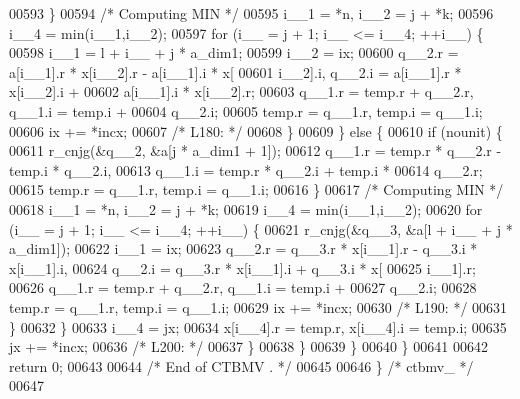 \begin{DoxyCode}
00593             \}
00594 \textcolor{comment}{/* Computing MIN */}
00595             i\_\_1 = *n, i\_\_2 = j + *k;
00596             i\_\_4 = min(i\_\_1,i\_\_2);
00597             \textcolor{keywordflow}{for} (i\_\_ = j + 1; i\_\_ <= i\_\_4; ++i\_\_) \{
00598                 i\_\_1 = l + i\_\_ + j * a\_dim1;
00599                 i\_\_2 = ix;
00600                 q\_\_2.r = a[i\_\_1].r * x[i\_\_2].r - a[i\_\_1].i * x[
00601                     i\_\_2].i, q\_\_2.i = a[i\_\_1].r * x[i\_\_2].i + 
00602                     a[i\_\_1].i * x[i\_\_2].r;
00603                 q\_\_1.r = temp.r + q\_\_2.r, q\_\_1.i = temp.i + 
00604                     q\_\_2.i;
00605                 temp.r = q\_\_1.r, temp.i = q\_\_1.i;
00606                 ix += *incx;
00607 \textcolor{comment}{/* L180: */}
00608             \}
00609             \} \textcolor{keywordflow}{else} \{
00610             \textcolor{keywordflow}{if} (nounit) \{
00611                 r\_cnjg(&q\_\_2, &a[j * a\_dim1 + 1]);
00612                 q\_\_1.r = temp.r * q\_\_2.r - temp.i * q\_\_2.i, 
00613                     q\_\_1.i = temp.r * q\_\_2.i + temp.i * 
00614                     q\_\_2.r;
00615                 temp.r = q\_\_1.r, temp.i = q\_\_1.i;
00616             \}
00617 \textcolor{comment}{/* Computing MIN */}
00618             i\_\_1 = *n, i\_\_2 = j + *k;
00619             i\_\_4 = min(i\_\_1,i\_\_2);
00620             \textcolor{keywordflow}{for} (i\_\_ = j + 1; i\_\_ <= i\_\_4; ++i\_\_) \{
00621                 r\_cnjg(&q\_\_3, &a[l + i\_\_ + j * a\_dim1]);
00622                 i\_\_1 = ix;
00623                 q\_\_2.r = q\_\_3.r * x[i\_\_1].r - q\_\_3.i * x[i\_\_1].i, 
00624                     q\_\_2.i = q\_\_3.r * x[i\_\_1].i + q\_\_3.i * x[
00625                     i\_\_1].r;
00626                 q\_\_1.r = temp.r + q\_\_2.r, q\_\_1.i = temp.i + 
00627                     q\_\_2.i;
00628                 temp.r = q\_\_1.r, temp.i = q\_\_1.i;
00629                 ix += *incx;
00630 \textcolor{comment}{/* L190: */}
00631             \}
00632             \}
00633             i\_\_4 = jx;
00634             x[i\_\_4].r = temp.r, x[i\_\_4].i = temp.i;
00635             jx += *incx;
00636 \textcolor{comment}{/* L200: */}
00637         \}
00638         \}
00639     \}
00640     \}
00641 
00642     \textcolor{keywordflow}{return} 0;
00643 
00644 \textcolor{comment}{/*     End of CTBMV . */}
00645 
00646 \} \textcolor{comment}{/* ctbmv\_ */}
00647 
\end{DoxyCode}
